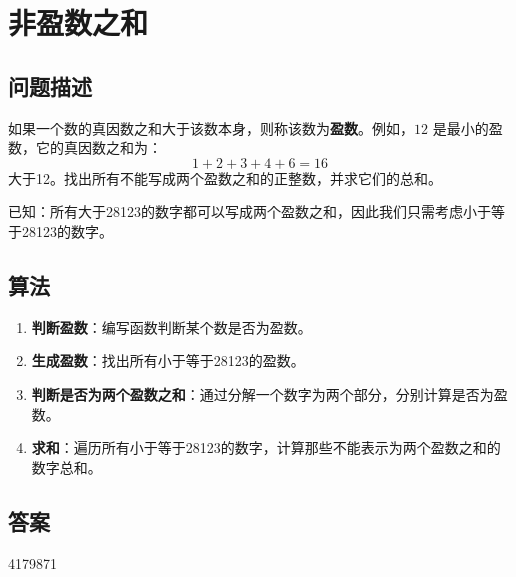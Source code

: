 \section{非盈数之和}\label{sec:problem23}
\subsection{问题描述}
\begin{tcolorbox}
	如果一个数的真因数之和大于该数本身，则称该数为\textbf{盈数}。例如，$12$ 是最小的盈数，它的真因数之和为：
	\[
		1 + 2 + 3 + 4 + 6 = 16
	\]
	大于12。找出所有不能写成两个盈数之和的正整数，并求它们的总和。

	已知：所有大于28123的数字都可以写成两个盈数之和，因此我们只需考虑小于等于28123的数字。

\end{tcolorbox}

\subsection{算法}
\begin{enumerate}
	\item \textbf{判断盈数}：编写函数判断某个数是否为盈数。
	\item \textbf{生成盈数}：找出所有小于等于28123的盈数。
	\item \textbf{判断是否为两个盈数之和}：通过分解一个数字为两个部分，分别计算是否为盈数。
	\item \textbf{求和}：遍历所有小于等于28123的数字，计算那些不能表示为两个盈数之和的数字总和。
\end{enumerate}

\subsection{答案}
4179871
